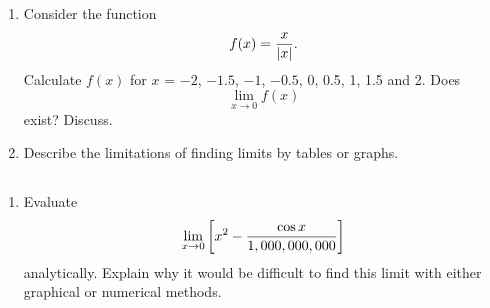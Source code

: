 \chapter{}  

 \section{}  \begin{enumerate}  
 
 \item  Consider the function $$f(x) = {x \over {\left| x \right|}}.$$  Calculate $f(x)$ for $x$ = $-2$, $-1.5$, $-1$, $-0.5$, 0, 0.5, 1, 1.5 and 2.  Does $$\mathop {\lim }\limits_{x \to 0} f(x)$$ exist? Discuss.  

\item  Describe the limitations of finding limits by tables or graphs. 

\end{enumerate}
\section{}
\begin{enumerate}


\item  Evaluate $$\mathop {\lim }\limits_{x \to 0} \left[ {x^2  - {{\cos x} \over {1,000,000,000}}} \right]$$ analytically.  Explain why it would be difficult to find this limit with either graphical or numerical methods. \cite{SBS} 

\end{enumerate}
